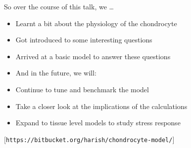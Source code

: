 \documentclass[ignorenonframetext]{beamer}
\newcommand{\references}[1] {
  \begin{flushright}
    \scriptsize [#1] \normalsize
  \end{flushright}
}
\begin{document}

\begin{frame}{So over the course of this talk, we \ldots}

  \begin{itemize}
  \item Learnt a bit about the physiology of the chondrocyte
  \item Got introduced to some interesting questions
  \item Arrived at a basic model to answer these questions\\[0.5cm]
  \end{itemize}

  \pause

  \begin{itemize}
    \item<2->[] \hspace{-0.5cm} And in the future, we will:
  \item<2-> Continue to tune and benchmark the model
  \item<2-> Take a closer look at the implications of the calculations
  \item<2-> Expand to tissue level models to study stress response
  \end{itemize}

  \references{{\tt https://bitbucket.org/harish/chondrocyte-model/}}

\end{frame}
\end{document}
